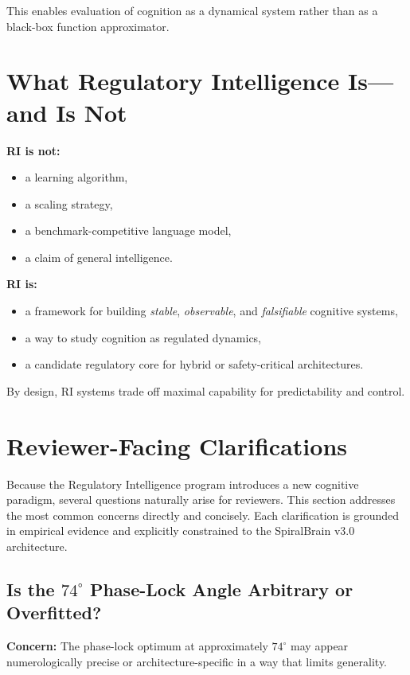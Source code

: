 \documentclass[12pt,a4paper]{report}
\begin{document}
This enables evaluation of cognition as a dynamical system rather than as a black-box function approximator.

\section{What Regulatory Intelligence Is—and Is Not}

\textbf{RI is not:}

\begin{itemize}
\item a learning algorithm,
\item a scaling strategy,
\item a benchmark-competitive language model,
\item a claim of general intelligence.
\end{itemize}

\textbf{RI is:}

\begin{itemize}
\item a framework for building \textit{stable}, \textit{observable}, and \textit{falsifiable} cognitive systems,
\item a way to study cognition as regulated dynamics,
\item a candidate regulatory core for hybrid or safety-critical architectures.
\end{itemize}

By design, RI systems trade off maximal capability for predictability and control.

\section{Reviewer-Facing Clarifications}

Because the Regulatory Intelligence program introduces a new cognitive paradigm, several questions naturally arise for reviewers. This section addresses the most common concerns directly and concisely. Each clarification is grounded in empirical evidence and explicitly constrained to the SpiralBrain v3.0 architecture.

\subsection{Is the \texorpdfstring{$74^\circ$}{74 degrees} 
Phase-Lock Angle Arbitrary or Overfitted?}

\textbf{Concern:}  
The phase-lock optimum at approximately $74^\circ$ may appear numerologically precise or architecture-specific in a way that limits generality.
\end{document}
